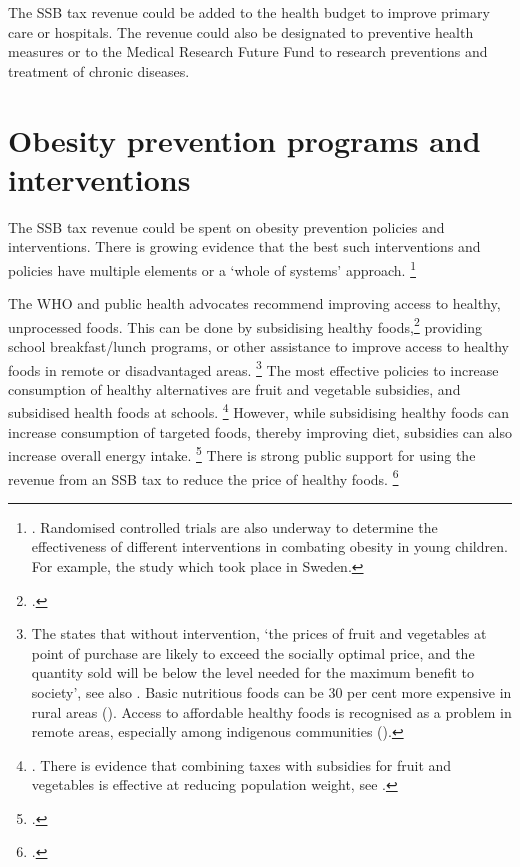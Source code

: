 \documentclass[embargoed]{grattan}
\begin{document}
The SSB tax revenue could be added to the health budget to improve primary care or hospitals.
The revenue could also be designated to preventive health measures or to the Medical Research Future Fund to research preventions and treatment of chronic diseases.

\section{Obesity prevention programs and interventions }\label{obesity-prevention-programs-and-interventions}

The SSB tax revenue could be spent on obesity prevention policies and interventions.
There is growing evidence that the best such interventions and policies have multiple elements or a `whole of systems' approach.%
\footnote{\textcites{Ewart-Pierce2016WholeCommunityObesity}{Health2016Insufficientphysicalactivity}{Hawkes2015Smartfoodpolicies}{Organization2016FiscalPoliciesDiet}{Roberto2012Factsfrontversus}{Mckinsey2014overcomingobesity}.
Randomised controlled trials are also underway to determine the effectiveness of different interventions in combating obesity in young children.
For example, the \textcite{Sobko2011randomisedcontrolledtrial} study which took place in Sweden.}

The WHO and public health advocates recommend improving access to healthy, unprocessed foods.
This can be done by subsidising healthy foods,\footcites{LordanShouldweput}{Organization2016FiscalPoliciesDiet} providing school breakfast/lunch programs, or other assistance to improve access to healthy foods in remote or disadvantaged areas.%
\footnote{The \textcite{Organisation2015Usingpricepolicies} states that without intervention, `the prices of fruit and vegetables at point of purchase are likely to exceed the socially optimal price, and the quantity sold will be below the level needed for the maximum benefit to society', see also \textcite{Kaplin2013Usingeconomicpolicy}.
Basic nutritious foods can be 30 per cent more expensive in rural areas (\textcite{Health2012Australiasfood}).
Access to affordable healthy foods is recognised as a problem in remote areas, especially among indigenous communities (\textcite{Thurber2014OverweightobesityIndigenous}).} The most effective policies to increase consumption of healthy alternatives are fruit and vegetable subsidies, and subsidised health foods at schools.%
\footnote{\textcites{Kaplin2013Usingeconomicpolicy}{Thow2014systematicrevieweffectiveness}{An2013Eatingbetterless}. {There is evidence that combining taxes with subsidies for fruit and vegetables is effective at reducing population weight, see \textcite{Organization2016FiscalPoliciesDiet}}.} However, while subsidising healthy foods can increase consumption of targeted foods, thereby improving diet, subsidies can also increase overall energy intake.%
\footcites{Kaplin2013Usingeconomicpolicy}{Organization2016FiscalPoliciesDiet}{Cawley2015economyscalesselective} There is strong public support for using the revenue from an SSB tax to reduce the price of healthy foods.%
\footcite{Morley2012Publicopinionfood}
\end{document}
